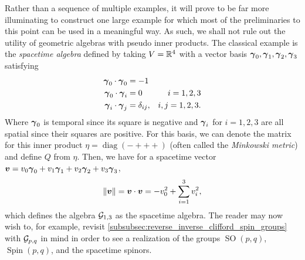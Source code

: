 Rather than a sequence of multiple examples, it will prove to be far more illuminating to construct one large example for which most of the preliminaries to this point can be used in a meaningful way. As such, we shall not rule out the utility of geometric algebras with pseudo inner products. The classical example is the \emph{spacetime algebra} defined by taking $V=\mathbb{R}^4$ with a vector basis $\boldsymbol{\gamma}_0,\boldsymbol{\gamma}_1,\boldsymbol{\gamma}_2,\boldsymbol{\gamma}_3$ satisfying
\begin{subequations}
\begin{align}
\boldsymbol{\gamma}_0 \cdot \boldsymbol{\gamma}_0 &= -1\\
\boldsymbol{\gamma}_0 \cdot \boldsymbol{\gamma}_i &= 0  &i=1,2,3\\
\boldsymbol{\gamma}_i \cdot \boldsymbol{\gamma}_j &= \delta_{ij}, &i,j=1,2,3.
\end{align}
\end{subequations}
Where $\boldsymbol{\gamma}_0$ is temporal since its square is negative and $\boldsymbol{\gamma}_i$ for $i=1,2,3$ are all spatial since their squares are positive. For this basis, we can denote the matrix for this inner product $\eta =\operatorname{diag}(-+++)$ (often called the \emph{Minkowski metric}) and define $Q$ from $\eta$. Then, we have for a spacetime vector $\boldsymbol{v} = v_0 \boldsymbol{\gamma}_0 +v_1 \boldsymbol{\gamma}_1 + v_2 \boldsymbol{\gamma}_2 + v_3 \boldsymbol{\gamma}_3$,
\begin{equation}
\label{eq:spacetime_inner_product}
\|\boldsymbol{v}\| = \boldsymbol{v} \cdot \boldsymbol{v} = -v_0^2 + \sum_{i=1}^3 v_i^2,
\end{equation}
which defines the algebra $\mathcal{G}_{1,3}$ as the spacetime algebra. The reader may now wish to, for example, revisit \cref{subsubsec:reverse_inverse_clifford_spin_groups} with $\mathcal{G}_{p,q}$ in mind in order to see a realization of the groups $\operatorname{SO}(p,q)$, $\operatorname{Spin}(p,q)$, and the spacetime spinors. 

